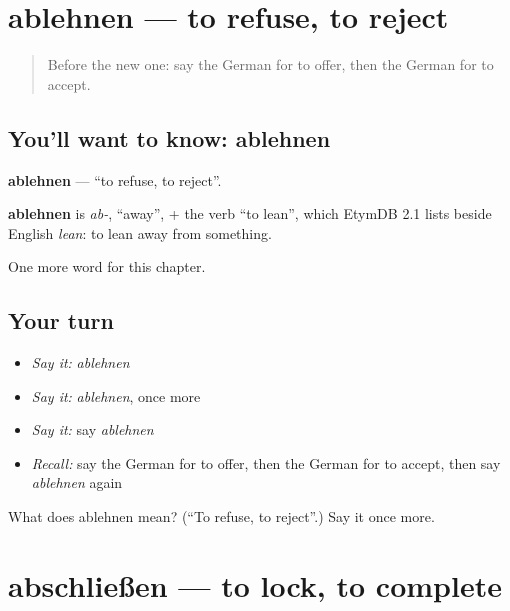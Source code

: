 \section[ablehnen]{ablehnen — to refuse, to reject}

\label{lesson:GE-C244-ablehnen}



\begin{quote}
Before the new one: say the German for to offer, then the German for to accept.
\end{quote}

\subsection*{You'll want to know: ablehnen}
\textbf{ablehnen} — \textquotedblleft{}to refuse, to reject\textquotedblright{}.

\begin{cousinweb}
\textbf{ablehnen} is \emph{ab-}, \textquotedblleft{}away\textquotedblright{}, + the verb \textquotedblleft{}to lean\textquotedblright{}, which EtymDB 2.1 lists beside English \emph{lean}: to lean away from something.
\end{cousinweb}

\begin{grammarlens}[title={What you've built}]
One more word for this chapter.
\end{grammarlens}

\subsection*{Your turn}
\begin{itemize}
\raggedright
  \item \emph{Say it:} \emph{ablehnen}
  \item \emph{Say it:} \emph{ablehnen}, once more
  \item \emph{Say it:} say \emph{ablehnen}
  \item \emph{Recall:} say the German for to offer, then the German for to accept, then say \emph{ablehnen} again
\end{itemize}

\begin{tcolorbox}[breakable,colback=teal!4,colframe=teal!35!black,title={Before you move on}]
What does ablehnen mean? (\textquotedblleft{}To refuse, to reject\textquotedblright{}.) Say it once more.
\end{tcolorbox}
\section[abschließen]{abschließen — to lock, to complete}

